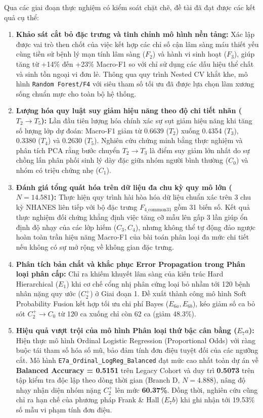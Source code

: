 Qua các giai đoạn thực nghiệm có kiểm soát chặt chẽ, đề tài đã đạt được các kết quả cụ thể:
\begin{enumerate}
    \item \textbf{Khảo sát cắt bỏ đặc trưng và tinh chỉnh mô hình nền tảng:} Xác lập được vai trò then chốt của việc kết hợp các chỉ số cận lâm sàng máu thiết yếu cùng tiền sử bệnh lý mạn tính lâm sàng ($F_2$) và hành vi sinh hoạt ($F_3$), giúp tăng từ +14\% đến +23\% Macro-F1 so với chỉ sử dụng các dấu hiệu thể chất và sinh tồn ngoại vi đơn lẻ. Thông qua quy trình Nested CV khắt khe, mô hình \texttt{Random Forest/F4} với siêu tham số tối ưu đã được lựa chọn làm xương sống chuẩn mực cho toàn bộ hệ thống.
    \item \textbf{Lượng hóa quy luật suy giảm hiệu năng theo độ chi tiết nhãn ($T_2 \to T_5$):} Lần đầu tiên lượng hóa chính xác sự sụt giảm hiệu năng khi tăng số lượng lớp dự đoán: Macro-F1 giảm từ 0.6639 ($T_2$) xuống 0.4354 ($T_3$), 0.3380 ($T_4$) và 0.2630 ($T_5$). Nghiên cứu chứng minh bằng thực nghiệm và phân tích PCA rằng bước chuyển $T_2 \to T_3$ là điểm suy giảm lớn nhất do sự chồng lấn phân phối sinh lý dày đặc giữa nhóm người bình thường ($C_0$) và nhóm có triệu chứng nhẹ ($C_1$).
    \item \textbf{Đánh giá tổng quát hóa trên dữ liệu đa chu kỳ quy mô lớn ($N = 14.581$):} Thực hiện quy trình hài hòa hóa dữ liệu chuẩn xác trên 3 chu kỳ NHANES liên tiếp với bộ đặc trưng $F_{4\_\text{common31}}$ gồm 31 biến số. Kết quả thực nghiệm đối chứng khẳng định việc tăng cỡ mẫu lên gấp 3 lần giúp ổn định độ nhạy của các lớp hiếm ($C_3, C_4$), nhưng không thể tự động đảo ngược hoàn toàn trần hiệu năng Macro-F1 của bài toán phân loại đa mức chi tiết nếu không có sự mở rộng về không gian đặc trưng.
    \item \textbf{Phân tích bản chất và khắc phục Error Propagation trong Phân loại phân cấp:} Chỉ ra khiếm khuyết lâm sàng của kiến trúc Hard Hierarchical ($E_1$) khi cơ chế cổng nhị phân cứng loại bỏ nhầm tới 120 bệnh nhân nặng quy ước ($C_2^+$) ở Giai đoạn 1. Đề xuất thành công mô hình Soft Probability Fusion kết hợp tối ưu chi phí Bayes ($E_{6a}, E_{6b}$), kéo giảm số ca bỏ sót $C_2^+ \to C_0$ từ 120 ca xuống chỉ còn 62 ca (giảm 48.3\%).
    \item \textbf{Hiệu quả vượt trội của mô hình Phân loại thứ bậc cân bằng ($E_7a$):} Hiện thực mô hình Ordinal Logistic Regression (Proportional Odds) với ràng buộc tái tham số hóa số mũ, bảo đảm tính đơn điệu tuyệt đối của các ngưỡng cắt. Mô hình \texttt{E7a\_Ordinal\_LogReg\_Balanced} đạt mức cao nhất toàn dự án về \textbf{Balanced Accuracy = 0.5151} trên Legacy Cohort và duy trì \textbf{0.5073} trên tập kiểm tra độc lập theo dòng thời gian (Branch D, $N = 4.888$), nâng độ nhạy nhận diện nhóm nặng $C_2^+$ lên mức \textbf{60.37\%}. Đồng thời, nghiên cứu cũng chỉ ra hạn chế của phương pháp Frank \& Hall ($E_7b$) khi ghi nhận tới 19.53\% số mẫu vi phạm tính đơn điệu.
\end{enumerate}

